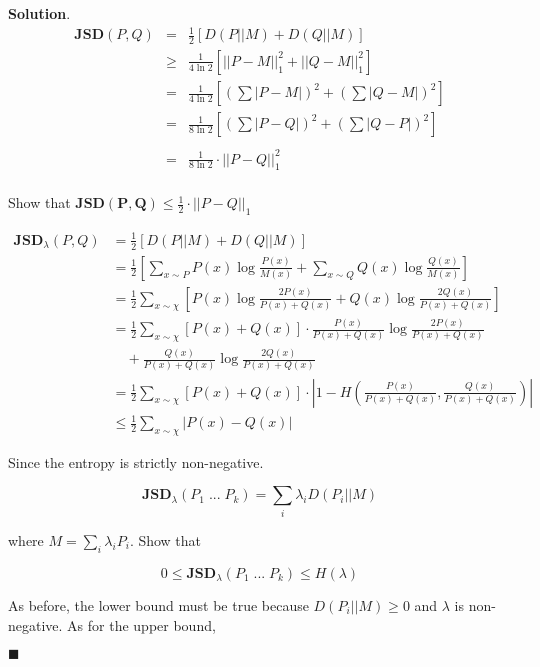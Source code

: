 \documentclass[12pt]{article}
\theoremstyle{definition}
\newenvironment{s}{%
        \begin{trivlist} \item \textbf{Solution}. }{%
            \hspace*{\fill} $\blacksquare$\end{trivlist}}%
\begin{document}
{\begin{s}
\begin{eqnarray*}
\mathbf{JSD}(P,Q) &=&  \frac{1}{2}\left[D(P||M) + D(Q||M)\right]\\
&\geq & \frac{1}{4\ln 2}\left[||P-M||_{1}^{2} + ||Q-M||_{1}^{2}\right]\\
&= & \frac{1}{4\ln 2}\left[\left(\sum |P-M|\right)^{2} + \left(\sum |Q-M|\right)^{2} \right]\\ &= & \frac{1}{8\ln 2}\left[\left(\sum |P-Q|\right)^{2} + \left(\sum |Q-P|\right)^{2} \right]\\
\\ &= & \frac{1}{8\ln 2} \cdot ||P-Q||_{1}^{2}\\
\end{eqnarray*}

Show that $\mathbf{JSD(P,Q)} \leq \frac{1}{2}\cdot ||P-Q||_{1}$ 

\begin{align*}
\mathbf{JSD}_{\lambda}(P,Q) &=  \frac{1}{2}\left[D(P||M) + D(Q||M)\right]\\
&= \frac{1}{2}\left[\sum_{x\sim P} P(x)\log\frac{P(x)}{M(x)} + \sum_{x\sim Q} Q(x)\log\frac{Q(x)}{M(x)}\right]\\
&= \frac{1}{2}\sum_{x\sim \chi}\left[P(x)\log\frac{2P(x)}{P(x)+Q(x)} + Q(x)\log\frac{2Q(x)}{P(x)+Q(x)} \right]\\
&= \frac{1}{2}\sum_{x\sim \chi}\left[P(x)+Q(x)\right]\cdot\frac{P(x)}{P(x)+Q(x)}\log\frac{2P(x)}{P(x)+Q(x)}\\
&\quad + \frac{Q(x)}{P(x)+Q(x)}\log\frac{2Q(x)}{P(x)+Q(x)}\\
&= \frac{1}{2}\sum_{x\sim \chi}\left[P(x)+Q(x)\right] \cdot |1-H\left(\frac{P(x)}{P(x)+Q(x)},\frac{Q(x)}{P(x)+Q(x)}\right)|\\
&\leq \frac{1}{2}\sum_{x\sim \chi} |P(x)-Q(x)|
\end{align*}

Since the entropy is strictly non-negative.

\begin{equation*}
\mathbf{JSD}_{\lambda}(P_{1} \; ... \; P_{k}) =  \sum_{i} \lambda_{i}D(P_{i}||M)
\end{equation*}

where $M = \sum_{i} \lambda_{i}P_{i}$. Show that 

\begin{equation*}
0 \leq \mathbf{JSD}_{\lambda}(P_{1} \; ... \; P_{k}) \leq H(\lambda)
\end{equation*}

As before, the lower bound must be true because $D(P_{i}||M) \geq 0$ and $\lambda$ is non-negative. As for the upper bound,


\end{s}}
\end{document}
